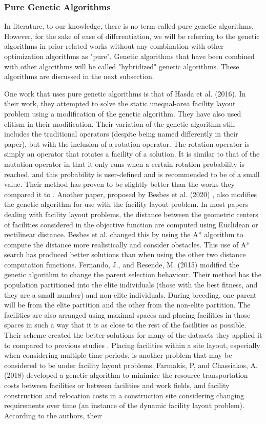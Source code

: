 \subsubsection{Pure Genetic Algorithms}
In literature, to our knowledge, there is no term called pure genetic algorithms. However, for the sake of ease of differentiation, we will be referring to the genetic algorithms in prior related works without any combination with other optimization algorithms as "pure". Genetic algorithms that have been combined with other algorithms will be called "hybridized" genetic algorithms. These algorithms are discussed in the next subsection.

One work that uses pure genetic algorithms is that of Hasda et al. (2016). In their work, they attempted to solve the static unequal-area facility layout problem using a modification of the genetic algorithm. They have also used elitism in their modification. Their variation of the genetic algorithm still includes the traditional operators (despite being named differently in their paper), but with the inclusion of a rotation operator. The rotation operator is simply an operator that rotates a facility of a solution. It is similar to that of the mutation operator in that it only runs when a certain rotation probability is reached, and this probability is user-defined and is recommended to be of a small value. Their method has proven to be slightly better than the works they compared it to \cite{Hasda2017}. Another paper, proposed by Besbes et al. (2020) \cite{Besbes2020}, also modifies the genetic algorithm for use with the facility layout problem. In most papers dealing with facility layout problems, the distance between the geometric centers of facilities considered in the objective function are computed using Euclidean or rectilinear distance. Besbes et al. changed this by using the A* algorithm to compute the distance more realistically and consider obstacles. This use of A* search has produced better solutions than when using the other two distance computation functions. Fernando, J., and Resende, M. (2015) modified the genetic algorithm to change the parent selection behaviour. Their method has the population partitioned into the elite individuals (those with the best fitness, and they are a small number) and non-elite individuals. During breeding, one parent will be from the elite partition and the other from the non-elite partition. The facilities are also arranged using maximal spaces and placing facilities in those spaces in such a way that it is as close to the rest of the facilities as possible. Their scheme created the better solutions for many of the datasets they applied it to compared to previous studies \cite{Fernando2015}. Placing facilities within a site layout, especially when considering multiple time periods, is another problem that may be considered to be under facility layout problems. Farmakis, P, and Chassiakos, A. (2018) developed a genetic algorithm to minimize the resource transportation costs between facilities or between facilities and work fields, and facility construction and relocation costs in a construction site considering changing requirements over time (an instance of the dynamic facility layout problem). According to the authors, their 